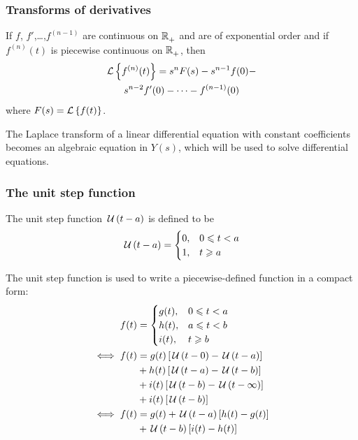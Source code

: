 \documentclass[10pt, twocolumn]{article}
\begin{document}
\subsubsection{Transforms of derivatives}
If \(f\), \(f'\),\dots{},\(f^{(n - 1)}\) are continuous on \(\mathbb{R}_{+}^{}\) and are of exponential order and if \(f^{(n)}(t)\) is piecewise continuous on \(\mathbb{R}_{+}^{}\), then
\begin{multline*}
  \mathcal{L}\left\{ f^{(n)}(t) \right\} = s^n F(s) - s^{n - 1} f(0) - \\
  s^{n - 2} f'(0) - \cdots - f^{(n - 1)}(0)
\end{multline*}
where \(F(s) = \mathcal{L}\left\{ f(t) \right\}\).

\begin{remark}
  The Laplace transform of a linear differential equation with constant coefficients becomes an algebraic equation in \(Y(s)\), which will be used to solve differential equations.
\end{remark}


\subsubsection{The unit step function}
The unit step function \(\,\mathcal{U}\left( t - a \right)\) is defined to be
\[
  \,\mathcal{U}\left( t - a \right) =
  \begin{cases}
    0, & 0 \leqslant t < a \\
    1, & t \geqslant a     \\
  \end{cases}
\]

The unit step function is used to write a piecewise-defined function in a compact form:
\begin{align*}
  f(t)      & =
  \begin{cases}
    g(t), & 0 \leqslant t < a \\
    h(t), & a \leqslant t < b \\
    i(t), & t \geqslant b
  \end{cases}                                                 \\
  \iff f(t) & = g(t)\left[ \,\mathcal{U}\left( t - 0 \right) - \,\mathcal{U}\left( t - a \right) \right]      \\
            & + h(t)\left[ \,\mathcal{U}\left( t - a \right) - \,\mathcal{U}\left( t - b \right) \right]      \\
            & + i(t)\left[ \,\mathcal{U}\left( t - b \right) - \,\mathcal{U}\left( t - \infty \right) \right] \\
            & + i(t)\left[ \,\mathcal{U}\left( t - b \right)\right]                          \\
  \iff f(t) & = g(t) + \,\mathcal{U}\left( t - a \right)\left[ h(t) - g(t) \right]           \\
            & + \,\mathcal{U}\left( t - b \right)\left[ i(t) - h(t) \right]
\end{align*}
\end{document}
